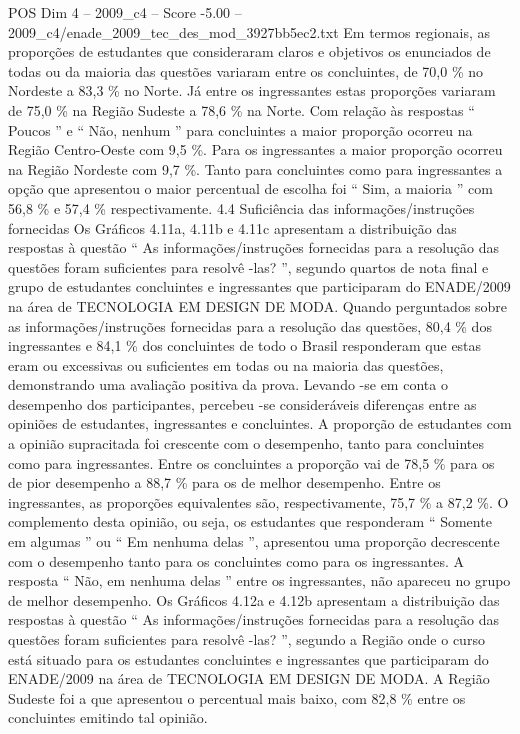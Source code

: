 \begin{textsample}{POS Dim 4 – 2009\_c4 – Score -5.00 – 2009\_c4/enade\_2009\_tec\_des\_mod\_3927bb5ec2.txt}
Em termos regionais, as proporções de estudantes que consideraram claros e objetivos os enunciados de todas ou da maioria das questões variaram entre os concluintes, de 70,0 \% no Nordeste a 83,3 \% no Norte.
Já entre os ingressantes estas proporções variaram de 75,0 \% na Região Sudeste a 78,6 \% na Norte.
Com relação às respostas “ Poucos ” e “ Não, nenhum ” para concluintes a maior proporção ocorreu na Região Centro-Oeste com 9,5 \%.
Para os ingressantes a maior proporção ocorreu na Região Nordeste com 9,7 \%.
Tanto para concluintes como para ingressantes a opção que apresentou o maior percentual de escolha foi “ Sim, a maioria ” com 56,8 \% e 57,4 \% respectivamente. 4.4 Suficiência das informações/instruções fornecidas Os Gráficos 4.11a, 4.11b e 4.11c apresentam a distribuição das respostas à questão “ As informações/instruções fornecidas para a resolução das questões foram suficientes para resolvê -las? ”, segundo quartos de nota final e grupo de estudantes concluintes e ingressantes que participaram do ENADE/2009 na área de TECNOLOGIA EM DESIGN DE MODA.
Quando perguntados sobre as informações/instruções fornecidas para a resolução das questões, 80,4 \% dos ingressantes e 84,1 \% dos concluintes de todo o Brasil responderam que estas eram ou excessivas ou suficientes em todas ou na maioria das questões, demonstrando uma avaliação positiva da prova.
Levando -se em conta o desempenho dos participantes, percebeu -se consideráveis diferenças entre as opiniões de estudantes, ingressantes e concluintes.
A proporção de estudantes com a opinião supracitada foi crescente com o desempenho, tanto para concluintes como para ingressantes.
Entre os concluintes a proporção vai de 78,5 \% para os de pior desempenho a 88,7 \% para os de melhor desempenho.
Entre os ingressantes, as proporções equivalentes são, respectivamente, 75,7 \% a 87,2 \%.
O complemento desta opinião, ou seja, os estudantes que responderam “ Somente em algumas ” ou “ Em nenhuma delas ”, apresentou uma proporção decrescente com o desempenho tanto para os concluintes como para os ingressantes.
A resposta “ Não, em nenhuma delas ” entre os ingressantes, não apareceu no grupo de melhor desempenho.
Os Gráficos 4.12a e 4.12b apresentam a distribuição das respostas à questão “ As informações/instruções fornecidas para a resolução das questões foram suficientes para resolvê -las? ”, segundo a Região onde o curso está situado para os estudantes concluintes e ingressantes que participaram do ENADE/2009 na área de TECNOLOGIA EM DESIGN DE MODA.
A Região Sudeste foi a que apresentou o percentual mais baixo, com 82,8 \% entre os concluintes emitindo tal opinião.

\end{textsample}
